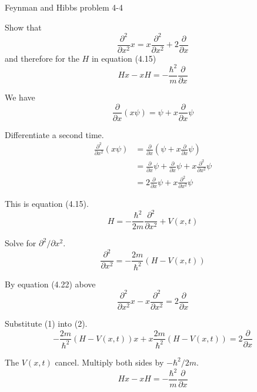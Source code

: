 \documentclass[12pt]{article}
\begin{document}
\begin{center}
Feynman and Hibbs problem 4-4
\end{center}

Show that
\begin{equation*}
\frac{\partial^2}{\partial x^2}x=x\frac{\partial^2}{\partial x^2}+2\frac{\partial}{\partial x}
\tag{4.22}
\end{equation*}
and therefore for the $H$ in equation (4.15)
\begin{equation*}
Hx-xH=-\frac{\hbar^2}{m}\frac{\partial}{\partial x}
\end{equation*}

We have
\begin{equation*}
\frac{\partial}{\partial x}(x\psi)=\psi+x\frac{\partial}{\partial x}\psi
\end{equation*}

Differentiate a second time.
\begin{align*}
\frac{\partial^2}{\partial x^2}(x\psi)
&=\frac{\partial}{\partial x}\left(\psi+x\frac{\partial}{\partial x}\psi\right)
\\
&=\frac{\partial}{\partial x}\psi+\frac{\partial}{\partial x}\psi+x\frac{\partial^2}{\partial x^2}\psi
\\
&=2\frac{\partial}{\partial x}\psi+x\frac{\partial^2}{\partial x^2}\psi
\end{align*}

This is equation (4.15).
\begin{equation*}
H=-\frac{\hbar^2}{2m}\frac{\partial^2}{\partial x^2}+V(x,t)
\end{equation*}

Solve for $\partial^2/\partial x^2$.
\begin{equation*}
\frac{\partial^2}{\partial x^2}=-\frac{2m}{\hbar^2}(H-V(x,t))
\tag{1}
\end{equation*}

By equation (4.22) above
\begin{equation*}
\frac{\partial^2}{\partial x^2}x-x\frac{\partial^2}{\partial x^2}=2\frac{\partial}{\partial x}
\tag{2}
\end{equation*}

Substitute (1) into (2).
\begin{equation*}
-\frac{2m}{\hbar^2}(H-V(x,t))x+x\frac{2m}{\hbar^2}(H-V(x,t))=2\frac{\partial}{\partial x}
\end{equation*}

The $V(x,t)$ cancel.
Multiply both sides by $-\hbar^2/2m$.
\begin{equation*}
Hx-xH=-\frac{\hbar^2}{m}\frac{\partial}{\partial x}
\end{equation*}
\end{document}
